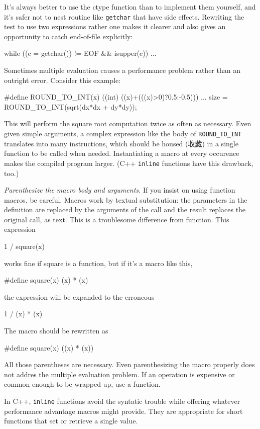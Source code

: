 It's always better to use the ctype function than to implement them
yourself, and it's safer not to nest routine like \verb'getchar' that have
side effects. Rewriting the test to use two expressions rather one makes it
clearer and also gives an opportunity to catch end-of-file explicitly:
\begin{wellcode}
    while ((c = getchar()) != EOF && isupper(c))
        ...
\end{wellcode}

Sometimes multiple evaluation causes a performance problem rather than an
outright error. Consider this example:
\begin{badcode}
    #define ROUND_TO_INT(x) ((int) ((x)+(((x)>0)?0.5:-0.5)))
        ...
    size = ROUND_TO_INT(sqrt(dx*dx + dy*dy));
\end{badcode}
This will perform the square root computation twice as often as necessary.
Even given simple arguments, a complex expression like the body of
\verb'ROUND_TO_INT' translates into many instructions, which should be
housed (收藏) in a single function to be called when needed. Instantiating a
macro at every occurence makes the compiled program larger. (C++
\verb'inline' functions have this drawback, too.)

\emph{Parenthesize the macro body and arguments.} If you insist on using
function macros, be careful. Macros work by textual substitution: the
parameters in the definition are replaced by the arguments of the call and
the result replaces the original call, as text. This is a troublesome
difference from function. This expression
\begin{wellcode}
    1 / square(x)
\end{wellcode}
works fine if square is a function, but if it's a macro like this,
\begin{badcode}
    #define square(x) (x) * (x)
\end{badcode}
the expression will be expanded to the erroneous
\begin{badcode}
    1 / (x) * (x)
\end{badcode}
The macro should be rewritten as 
\begin{wellcode}
    #define square(x) ((x) * (x))
\end{wellcode}
All those parentheses are necessary. Even parenthesizing the macro properly
does not addres the multiple evaluation problem. If an operation is
expensive or common enough to be wrapped up, use a function.

In C++, \verb'inline' functions avoid the syntatic trouble while offering
whatever performance advantage macros might provide. They are appropriate
for short functions that set or retrieve a single value.

